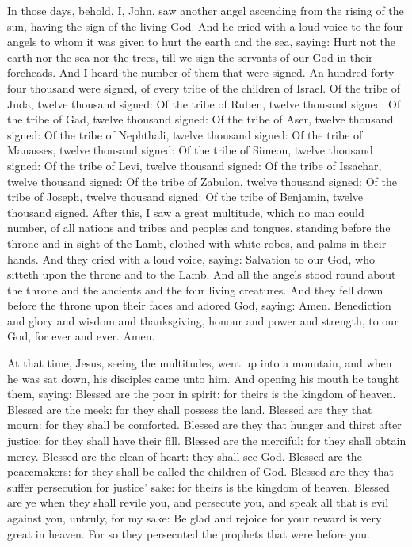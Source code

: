 \begin{multicols}{2}
In those days, behold, I, John, saw another angel ascending from the rising of the sun,
having the sign of the living God. And he cried with a loud voice to the
four angels to whom it was given to hurt the earth and the sea,
saying: Hurt not the earth nor the sea nor the trees, till we sign
the servants of our God in their foreheads.
And I heard the number of them that were signed. An hundred forty-
four thousand were signed, of every tribe of the children of Israel.
Of the tribe of Juda, twelve thousand signed: Of the tribe of
Ruben, twelve thousand signed: Of the tribe of Gad, twelve thousand
signed:
Of the tribe of Aser, twelve thousand signed: Of the tribe of
Nephthali, twelve thousand signed: Of the tribe of Manasses, twelve
thousand signed:
Of the tribe of Simeon, twelve thousand signed: Of the tribe of
Levi, twelve thousand signed: Of the tribe of Issachar, twelve thousand
signed:
Of the tribe of Zabulon, twelve thousand signed: Of the tribe of
Joseph, twelve thousand signed: Of the tribe of Benjamin, twelve
thousand signed.
After this, I saw a great multitude, which no man could number, of
all nations and tribes and peoples and tongues, standing before the
throne and in sight of the Lamb, clothed with white robes, and palms in
their hands.
And they cried with a loud voice, saying: Salvation to our God,
who sitteth upon the throne and to the Lamb.
And all the angels stood round about the throne and the ancients
and the four living creatures. And they fell down before the throne upon
their faces and adored God,
saying: Amen. Benediction and glory and wisdom and thanksgiving,
honour and power and strength, to our God, for ever and ever. Amen.



At that time, Jesus, seeing the multitudes, went up into a mountain, and when he
was sat down, his disciples came unto him.
And opening his mouth he taught them, saying:
Blessed are the poor in spirit: for theirs is the kingdom of
heaven.
Blessed are the meek: for they shall possess the land.
Blessed are they that mourn: for they shall be comforted.
Blessed are they that hunger and thirst after justice: for they
shall have their fill.
Blessed are the merciful: for they shall obtain mercy.
Blessed are the clean of heart: they shall see God.
Blessed are the peacemakers: for they shall be called the children
of God.
Blessed are they that suffer persecution for justice' sake: for
theirs is the kingdom of heaven.
Blessed are ye when they shall revile you, and persecute you, and
speak all that is evil against you, untruly, for my sake:
Be glad and rejoice for your reward is very great in heaven. For
so they persecuted the prophets that were before you.



\end{multicols}
